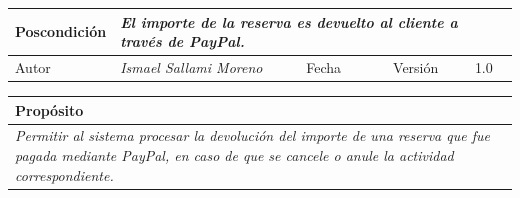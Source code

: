 \begin{table}[H]
\begin{tabular}{llllllll}
        \multicolumn{1}{|l|}{Poscondición}                           & \multicolumn{7}{l|}{{\color[HTML]{808080} \textit{El importe de la reserva es devuelto al cliente a través de PayPal.}}}                                                                                                                                                                                                                                                       \\ \hline
        \multicolumn{1}{|l|}{Autor}                                  & \multicolumn{1}{l|}{{\color[HTML]{808080} \textit{Ismael Sallami Moreno}}}                           & \multicolumn{2}{l|}{Fecha}                                                   & \multicolumn{1}{l|}{}                          & \multicolumn{2}{l|}{Versión}                                                      & \multicolumn{1}{l|}{1.0}                                                     \\ \hline
        \end{tabular}
        \end{table}

        \begin{table}[H]
            \begin{tabular}{llllllll}
        \hline
        \multicolumn{8}{|l|}{\cellcolor[HTML]{F2F2F2}Propósito}                                                                                                                                                                                                                                                                                                                                                                                           \\ \hline
        \multicolumn{8}{|p{15cm}|}{{\color[HTML]{808080} \textit{Permitir al sistema procesar la devolución del importe de una reserva que fue pagada mediante PayPal, en caso de que se cancele o anule la actividad correspondiente.}}}                                                                                                                                                                                                             \\ \hline
        \end{tabular}
        \end{table}

